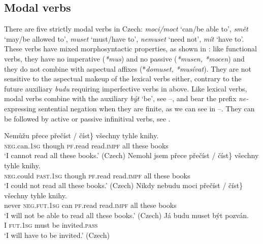 \documentclass[output=paper,colorlinks,citecolor=brown,
modfonts
]{langscibook}
\begin{document}
\subsection{Modal verbs} \label{sec:3.2} 
There are five strictly modal verbs in Czech: \textit{moci/moct} `can/be able to', \textit{smět} `may/be allowed to', \textit{muset} `must/have to', \textit{nemuset} `need not', \textit{mít} `have to'. These verbs have mixed morphosyntactic properties, as shown in \cite{Kyncl2008}: like functional verbs, they have no imperative (\textit{*mus}) and no passive (\textit{*musen, *mocen}) and they do not combine with aspectual affixes (*\textit{domuset, *musívat}). They are not sensitive to the aspectual makeup of the lexical verbs either, contrary to the future auxiliary \textit{budu} requiring imperfective verbs in  above. Like lexical verbs, modal verbs combine with the auxiliary \textit{být} `be', see --, and bear the prefix \textit{ne-} expressing sentential negation when they are finite, as we can see in --. They can be followed by active or passive infinitival verbs, see .

\begin{exe}
\ex \label{14}
\begin{xlist}
\ex \label{14a}\gll Nemůžu přece \minsp{\{} přečíst  / číst\} všechny tyhle knihy. \\
\textsc{neg}.can.\textsc{1sg} though {} \textsc{pf}.read {}  read.\textsc{impf} all these books \\
\glt `I cannot read all these books.'  \hfill (Czech)
\ex \label{14b}\gll Nemohl jsem přece \minsp{\{} přečíst / číst\} všechny tyhle knihy.\\
\textsc{neg}.could  \textsc{past}.\textsc{1sg} though {} \textsc{pf}.read {}  read.\textsc{impf} all  these books\\
\glt `I could not read all these books.'  \hfill (Czech)
\ex \label{14c}\gll Nikdy  nebudu moci  \minsp{\{} přečíst  / číst\} všechny tyhle  knihy. \\
never \textsc{neg}.\textsc{fut}.\textsc{1sg} can {} \textsc{pf}.read {} read.\textsc{impf} all these books \\
\glt `I will not be able to read all these books.'   \hfill (Czech)
\ex \label{14d} \gll Já budu muset být pozván.\\
I   \textsc{fut}.\textsc{1sg}  must  be   invited.\textsc{pass} \\
\glt  `I will have to be invited.'   \hfill (Czech)
\end{xlist}
\end{exe}
\end{document}
